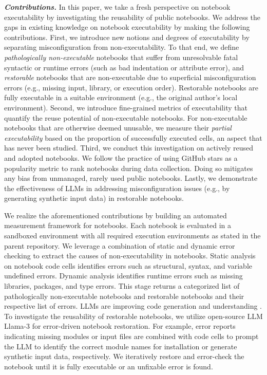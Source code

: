 \noindent\textbf{\emph{Contributions.}} In this paper, we take a fresh perspective on notebook executability by investigating the reusability of public notebooks. We address the gaps in existing knowledge on notebook executability by making the following contributions. 
%
First, we introduce new notions and degrees of executability by separating misconfiguration from non-executability. To that end, we define {\em pathologically non-executable} notebooks that suffer from unresolvable fatal syntactic or runtime errors (such as bad indentation or attribute error), and {\em restorable} notebooks that are non-executable due to superficial misconfiguration errors (e.g., missing input, library, or execution order). Restorable notebooks are fully executable in a suitable environment (e.g., the original author's local environment).
%
Second, we introduce fine-grained metrics of executability that quantify the reuse potential of non-executable notebooks. For non-executable notebooks that are otherwise deemed unusable, we measure their {\em partial executability} based on the proportion of successfully executed cells, an aspect that has never been studied.
%
Third, we conduct this investigation on actively reused and adopted notebooks. We follow the practice of using GitHub stars as a popularity metric \cite{Borges2016, KocKleJoh24} to rank notebooks during data collection. Doing so mitigates any bias from unmanaged, rarely used public notebooks. 
%
Lastly, we demonstrate the effectiveness of LLMs in addressing misconfiguration issues (e.g., by generating synthetic input data) in restorable notebooks.


We realize the aforementioned contributions by building an automated measurement framework for notebooks. Each notebook is evaluated in a sandboxed environment with all required execution environments as stated in the parent repository. We leverage a combination of static and dynamic error checking to extract the causes of non-executability in notebooks. Static analysis on notebook code cells identifies errors such as structural, syntax, and variable undefined errors. Dynamic analysis identifies runtime errors such as missing libraries, packages, and type errors. This stage returns a categorized list of pathologically non-executable notebooks and restorable notebooks and their respective list of errors. LLMs are improving code generation and understanding \cite{Nejjar, lin2024soen101codegenerationemulating}. To investigate the reusability of restorable notebooks, we utilize open-source LLM Llama-3 for error-driven notebook restoration. For example, error reports indicating missing modules or input files are combined with code cells to prompt the LLM to identify the correct module names for installation or generate synthetic input data, respectively. We iteratively restore and error-check the notebook until it is fully executable or an unfixable error is found. 

